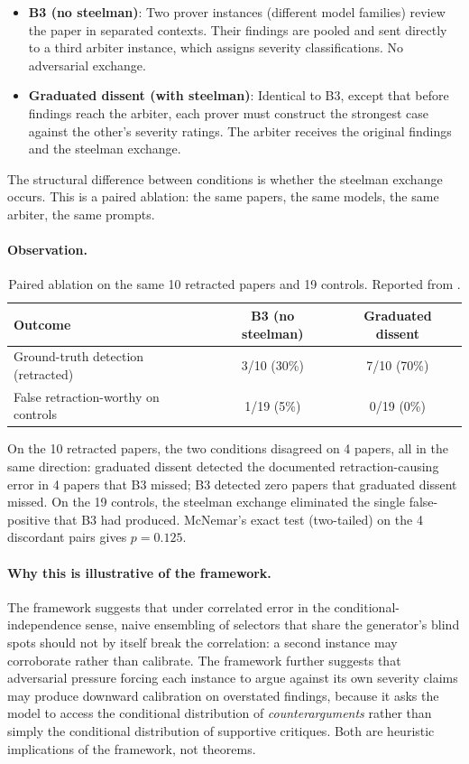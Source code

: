 \documentclass[11pt]{article}
\begin{document}
\begin{itemize}
\item \textbf{B3 (no steelman)}: Two prover instances (different model families) review the paper in separated contexts. Their findings are pooled and sent directly to a third arbiter instance, which assigns severity classifications. No adversarial exchange.
\item \textbf{Graduated dissent (with steelman)}: Identical to B3, except that before findings reach the arbiter, each prover must construct the strongest case against the other's severity ratings. The arbiter receives the original findings and the steelman exchange.
\end{itemize}

The structural difference between conditions is whether the steelman exchange occurs. This is a paired ablation: the same papers, the same models, the same arbiter, the same prompts.

\paragraph{Observation.}

\begin{table}[h]
\centering
\caption{Paired ablation on the same 10 retracted papers and 19 controls. Reported from \citet{brilliant2026benchmark}.}
\begin{tabular}{lcc}
\toprule
\textbf{Outcome} & \textbf{B3 (no steelman)} & \textbf{Graduated dissent} \\
\midrule
Ground-truth detection (retracted) & 3/10 (30\%) & 7/10 (70\%) \\
False retraction-worthy on controls & 1/19 (5\%) & 0/19 (0\%) \\
\bottomrule
\end{tabular}
\end{table}

On the 10 retracted papers, the two conditions disagreed on 4 papers, all in the same direction: graduated dissent detected the documented retraction-causing error in 4 papers that B3 missed; B3 detected zero papers that graduated dissent missed. On the 19 controls, the steelman exchange eliminated the single false-positive that B3 had produced. McNemar's exact test (two-tailed) on the 4 discordant pairs gives $p = 0.125$.

\paragraph{Why this is illustrative of the framework.} The framework suggests that under correlated error in the conditional-independence sense, naive ensembling of selectors that share the generator's blind spots should not by itself break the correlation: a second instance may corroborate rather than calibrate. The framework further suggests that adversarial pressure forcing each instance to argue against its own severity claims may produce downward calibration on overstated findings, because it asks the model to access the conditional distribution of \emph{counterarguments} rather than simply the conditional distribution of supportive critiques. Both are heuristic implications of the framework, not theorems.
\end{document}
